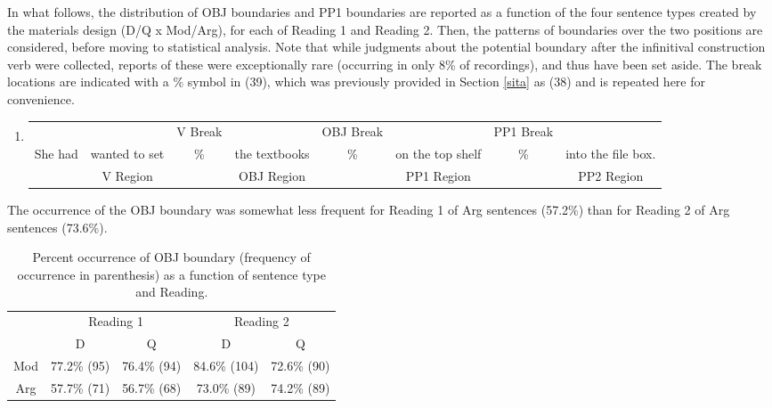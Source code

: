 \documentclass[11pt,oneside]{book}
\providecommand{\tightlist}{%
  \setlength{\itemsep}{0pt}\setlength{\parskip}{0pt}}
\begin{document}
In what follows, the distribution of OBJ boundaries and PP1 boundaries are reported as a function of the four sentence types created by the materials design (D/Q x Mod/Arg), for each of Reading 1 and Reading 2. Then, the patterns of boundaries over the two positions are considered, before moving to statistical analysis. Note that while judgments about the potential boundary after the infinitival construction verb were collected, reports of these were exceptionally rare (occurring in only 8\% of recordings), and thus have been set aside. The break locations are indicated with a \% symbol in (39), which was previously provided in Section \ref{sita} as (38) and is repeated here for convenience.

\begin{enumerate}
\def\labelenumi{(\arabic{enumi})}
\setcounter{enumi}{38}
\tightlist
\item
  \begingroup
  \setlength{\tabcolsep}{1pt}

  \begin{tabular}{cccccccc}
    & & \footnotesize V Break & & \footnotesize OBJ Break & & \footnotesize PP1 Break & \\
    She had & wanted to set & \% & the textbooks & \% & on the top shelf & \% & into the file box. \\
    \cmidrule(r){2-2} \cmidrule(r){4-4} \cmidrule(r){6-6} \cmidrule(r){8-8} 
    & \footnotesize V Region & & \footnotesize OBJ Region & & \footnotesize PP1 Region & & PP2 Region \\
  \end{tabular}
    \endgroup
\end{enumerate}

The occurrence of the OBJ boundary was somewhat less frequent for Reading 1 of Arg sentences (57.2\%) than for Reading 2 of Arg sentences (73.6\%).

\begin{table}[!h]

\caption{\label{tab:obj}Percent occurrence of OBJ boundary (frequency of occurrence in parenthesis) as a function of sentence type and Reading.}
\centering
\begin{tabular}{ccccc}
\toprule
\multicolumn{1}{c}{ } & \multicolumn{2}{c}{Reading 1} & \multicolumn{2}{c}{Reading 2} \\
\cmidrule(l{3pt}r{3pt}){2-3} \cmidrule(l{3pt}r{3pt}){4-5}
 & D & Q & D & Q\\
\midrule
Mod & 77.2\% (95) & 76.4\% (94) & 84.6\% (104) & 72.6\% (90)\\
Arg & 57.7\% (71) & 56.7\% (68) & 73.0\% (89) & 74.2\% (89)\\
\bottomrule
\end{tabular}
\end{table}
\end{document}
